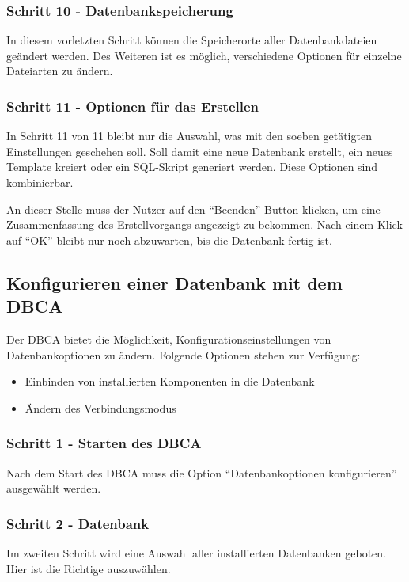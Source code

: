         \subsubsection{Schritt 10 - Datenbankspeicherung}
          In diesem vorletzten Schritt können die Speicherorte aller Datenbankdateien geändert werden. Des Weiteren ist es möglich, verschiedene Optionen für einzelne Dateiarten zu ändern.
        \subsubsection{Schritt 11 - Optionen für das Erstellen}
          In Schritt 11 von 11 bleibt nur die Auswahl, was mit den soeben getätigten Einstellungen geschehen soll. Soll damit eine neue Datenbank erstellt, ein neues Template kreiert oder ein SQL-Skript generiert werden. Diese Optionen sind kombinierbar.

          An dieser Stelle muss der Nutzer auf den \enquote{Beenden}-Button klicken, um eine Zusammenfassung des Erstellvorgangs angezeigt zu bekommen.
\clearpage
          Nach einem Klick auf \enquote{OK} bleibt nur noch abzuwarten, bis die Datenbank fertig ist.
\clearpage
				\subsection{Konfigurieren einer Datenbank mit dem DBCA}
          Der DBCA bietet die Möglichkeit, Konfigurationseinstellungen von Datenbankoptionen zu ändern. Folgende Optionen stehen zur Verfügung:
          \begin{itemize}
            \item Einbinden von installierten Komponenten in die Datenbank
            \item Ändern des Verbindungsmodus
          \end{itemize}
          \subsubsection{Schritt 1 - Starten des DBCA}
            Nach dem Start des DBCA muss die Option \enquote{Datenbankoptionen konfigurieren} ausgewählt werden.
          \subsubsection{Schritt 2 - Datenbank }
            Im zweiten Schritt wird eine Auswahl aller installierten Datenbanken geboten. Hier ist die Richtige auszuwählen.

